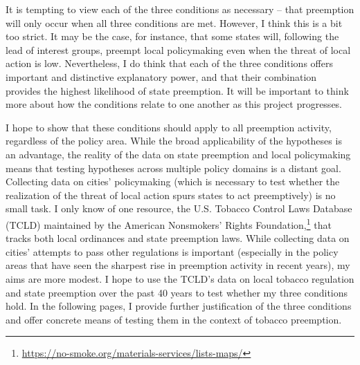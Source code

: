 \documentclass[12pt]{article}
\begin{document}
It is tempting to view each of the three conditions as necessary -- that preemption will only occur when all three conditions are met. However, I think this is a bit too strict. It may be the case, for instance, that some states will, following the lead of interest groups, preempt local policymaking even when the threat of local action is low. Nevertheless, I do think that each of the three conditions offers important and distinctive explanatory power, and that their combination provides the highest likelihood of state preemption. It will be important to think more about how the conditions relate to one another as this project progresses.

I hope to show that these conditions should apply to all preemption activity, regardless of the policy area. While the broad applicability of the hypotheses is an advantage, the reality of the data on state preemption and local policymaking means that testing hypotheses across multiple policy domains is a distant goal. Collecting data on cities' policymaking (which is necessary to test whether the realization of the threat of local action spurs states to act preemptively) is no small task. I only know of one resource, the U.S. Tobacco Control Laws Database (TCLD) maintained by the American Nonsmokers' Rights Foundation,\footnote{\url{https://no-smoke.org/materials-services/lists-maps/}} that tracks both local ordinances and state preemption laws. While collecting data on cities' attempts to pass other regulations is important (especially in the policy areas that have seen the sharpest rise in preemption activity in recent years), my aims are more modest. I hope to use the TCLD's data on local tobacco regulation and state preemption over the past 40 years to test whether my three conditions hold. In the following pages, I provide further justification of the three conditions and offer concrete means of testing them in the context of tobacco preemption. 
\end{document}
